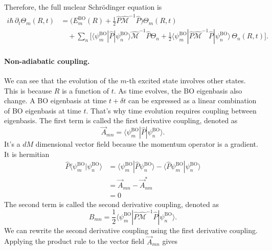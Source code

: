 \documentclass[11pt]{article}      %
\numberwithin{equation}{section}   %
\begin{document}
Therefore, the full nuclear Schr\"odinger equation is
\begin{equation}
    \boxed{
    \begin{aligned}
        i\hbar\,\partial_t \Theta_m(R,t)&=\bigg(E^{\mathrm{BO}}_m(R)+\frac{1}{2}\hat{P} \hat{\mathcal{M}}^{-1} \hat{P} \bigg)\Theta_m(R,t)\\
        &\quad+\sum_n\bigg[
        \langle\psi^{\mathrm{BO}}_m|\hat{P}|\psi^{\mathrm{BO}}_n\rangle\hat{\mathcal{M}}^{-1}\hat{P}\Theta_n
        +\frac{1}{2}\langle\psi^{\mathrm{BO}}_m|\hat{P}\hat{\mathcal{M}}^{-1}\hat{P}|\psi^{\mathrm{BO}}_n\rangle\,\Theta_n(R,t)\bigg].
    \end{aligned}}
\end{equation}

\paragraph{Non-adiabatic coupling.}We can see that the evolution of the $m$-th excited state involves other states. This is because $R$ is a function of $t$. As time evolves, the BO eigenbasis also change. A BO eigenbasis at time $t+\delta t$ can be expressed as a linear combination of BO eigenbasis at time $t$. That's why time evolution requires coupling between eigenbasis. The first term is called the first derivative coupling, denoted as
\begin{equation}
    \boxed{
        \vec A_{mn} =  \langle\psi^{\mathrm{BO}}_m|\hat{P}|\psi^{\mathrm{BO}}_n\rangle.
    }
\end{equation}
It's a $dM$ dimensional vector field because the momentum operator is a gradient. It is hermitian
\begin{equation}
    \begin{aligned}
        \hat P\langle\psi^{\mathrm{BO}}_m|\psi^{\mathrm{BO}}_n\rangle&=\langle\psi^{\mathrm{BO}}_m|\hat P\psi^{\mathrm{BO}}_n\rangle-\langle\hat P\psi^{\mathrm{BO}}_m|\psi^{\mathrm{BO}}_n\rangle \\ 
        &=\vec A_{mn}- \vec A^*_{nm} \\ 
        &=0
    \end{aligned}
\end{equation}
The second term is called the second derivative coupling, denoted as
\begin{equation}
    \boxed{
        B_{mn} =  \frac{1}{2}\langle\psi^{\mathrm{BO}}_m|\hat{P}\hat{\mathcal{M}}^{-1}\hat{P}|\psi^{\mathrm{BO}}_n\rangle.
    }
\end{equation}
We can rewrite the second derivative coupling using the first derivative coupling. Applying the product rule to the vector field $\vec A_{mn}$ gives
\end{document}
